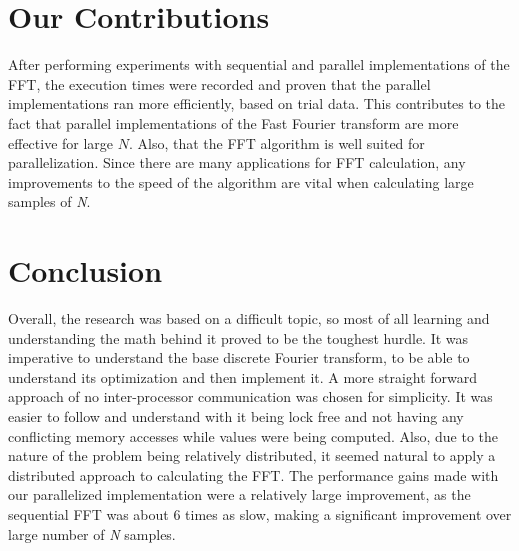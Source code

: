 \documentclass[journal]{IEEEtran}
\begin{document}
\section{Our Contributions}
	\par{
		After performing experiments with sequential and parallel implementations of the FFT, the execution times were 
		recorded and proven that the parallel implementations ran more efficiently, based on trial data. This contributes to the fact 
		that parallel implementations of the Fast Fourier transform are more effective for large $N$. Also, that the FFT algorithm 
		is well suited for parallelization. Since there are many applications for FFT calculation, any improvements to the speed 
		of the algorithm are vital when calculating large samples of \textit{N}.
	}

\section{Conclusion}
	\par{
		Overall, the research was based on a difficult topic, so most of all learning and understanding the 
		math behind it proved to be the toughest hurdle. It was imperative to understand the base discrete 
		Fourier transform, to be able to understand its optimization and then implement it. A more straight 
		forward approach of no inter-processor communication was chosen for simplicity. It was easier to 
		follow and understand with it being lock free and not having any conflicting memory accesses while 
		values were being computed. Also, due to the nature of the problem being relatively distributed, it 
		seemed natural to apply a distributed approach to calculating the FFT. The performance gains made 
		with our parallelized implementation were a relatively large improvement, as the sequential FFT was 
		about 6 times as slow, making a significant improvement over large number of \textit{N} samples.
	}
\pagebreak

\medskip


\end{document}
